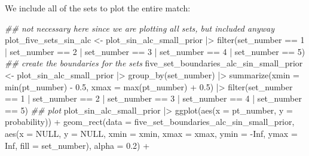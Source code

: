 \documentclass[
  letterpaper,
  DIV=11,
  numbers=noendperiod]{scrartcl}
\newenvironment{Shaded}{\begin{snugshade}}{\end{snugshade}}
\newcommand{\AttributeTok}[1]{\textcolor[rgb]{0.40,0.45,0.13}{#1}}
\newcommand{\ConstantTok}[1]{\textcolor[rgb]{0.56,0.35,0.01}{#1}}
\newcommand{\DecValTok}[1]{\textcolor[rgb]{0.68,0.00,0.00}{#1}}
\newcommand{\DocumentationTok}[1]{\textcolor[rgb]{0.37,0.37,0.37}{\textit{#1}}}
\newcommand{\FloatTok}[1]{\textcolor[rgb]{0.68,0.00,0.00}{#1}}
\newcommand{\FunctionTok}[1]{\textcolor[rgb]{0.28,0.35,0.67}{#1}}
\newcommand{\NormalTok}[1]{\textcolor[rgb]{0.00,0.23,0.31}{#1}}
\newcommand{\OtherTok}[1]{\textcolor[rgb]{0.00,0.23,0.31}{#1}}
\newcommand{\SpecialCharTok}[1]{\textcolor[rgb]{0.37,0.37,0.37}{#1}}
\begin{document}
We include all of the sets to plot the entire match:

\linespread{0.9}

\begin{Shaded}
\begin{Highlighting}[]
\DocumentationTok{\#\# not necessary here since we are plotting all sets, but included anyway}
\NormalTok{plot\_five\_sets\_sin\_alc }\OtherTok{\textless{}{-}}\NormalTok{ plot\_sin\_alc\_small\_prior }\SpecialCharTok{|\textgreater{}}
  \FunctionTok{filter}\NormalTok{(set\_number }\SpecialCharTok{==} \DecValTok{1} \SpecialCharTok{|}\NormalTok{ set\_number }\SpecialCharTok{==} \DecValTok{2} \SpecialCharTok{|} 
\NormalTok{           set\_number }\SpecialCharTok{==} \DecValTok{3} \SpecialCharTok{|}\NormalTok{ set\_number }\SpecialCharTok{==} \DecValTok{4} \SpecialCharTok{|} 
\NormalTok{           set\_number }\SpecialCharTok{==} \DecValTok{5}\NormalTok{)}
\DocumentationTok{\#\# create the boundaries for the sets}
\NormalTok{five\_set\_boundaries\_alc\_sin\_small\_prior }\OtherTok{\textless{}{-}}\NormalTok{ plot\_sin\_alc\_small\_prior }\SpecialCharTok{|\textgreater{}}
  \FunctionTok{group\_by}\NormalTok{(set\_number) }\SpecialCharTok{|\textgreater{}}
  \FunctionTok{summarize}\NormalTok{(}\AttributeTok{xmin =} \FunctionTok{min}\NormalTok{(pt\_number) }\SpecialCharTok{{-}} \FloatTok{0.5}\NormalTok{,}
            \AttributeTok{xmax =} \FunctionTok{max}\NormalTok{(pt\_number) }\SpecialCharTok{+} \FloatTok{0.5}\NormalTok{) }\SpecialCharTok{|\textgreater{}}
  \FunctionTok{filter}\NormalTok{(set\_number }\SpecialCharTok{==} \DecValTok{1} \SpecialCharTok{|}\NormalTok{ set\_number }\SpecialCharTok{==} \DecValTok{2} \SpecialCharTok{|} 
\NormalTok{           set\_number }\SpecialCharTok{==} \DecValTok{3} \SpecialCharTok{|}\NormalTok{ set\_number }\SpecialCharTok{==} \DecValTok{4} \SpecialCharTok{|} 
\NormalTok{           set\_number }\SpecialCharTok{==} \DecValTok{5}\NormalTok{)}
\DocumentationTok{\#\# plot}
\NormalTok{plot\_sin\_alc\_small\_prior }\SpecialCharTok{|\textgreater{}} \FunctionTok{ggplot}\NormalTok{(}\FunctionTok{aes}\NormalTok{(}\AttributeTok{x =}\NormalTok{ pt\_number, }\AttributeTok{y =}\NormalTok{ probability)) }\SpecialCharTok{+}
  \FunctionTok{geom\_rect}\NormalTok{(}\AttributeTok{data =}\NormalTok{ five\_set\_boundaries\_alc\_sin\_small\_prior, }
            \FunctionTok{aes}\NormalTok{(}\AttributeTok{x =} \ConstantTok{NULL}\NormalTok{, }\AttributeTok{y =} \ConstantTok{NULL}\NormalTok{, }\AttributeTok{xmin =}\NormalTok{ xmin, }\AttributeTok{xmax =}\NormalTok{ xmax,}
                \AttributeTok{ymin =} \SpecialCharTok{{-}}\ConstantTok{Inf}\NormalTok{, }\AttributeTok{ymax =} \ConstantTok{Inf}\NormalTok{, }\AttributeTok{fill =}\NormalTok{ set\_number), }\AttributeTok{alpha =} \FloatTok{0.2}\NormalTok{) }\SpecialCharTok{+} 

\end{Highlighting}
\end{Shaded}
\end{document}
